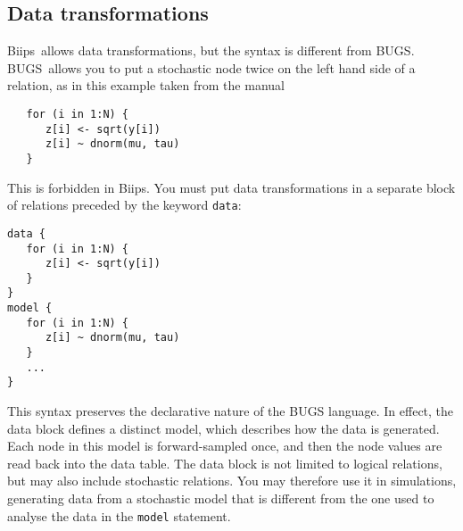 \documentclass[11pt, a4paper, titlepage]{report}
\newcommand{\biips}{\textsf{Biips}}
\newcommand{\BUGS}{\textsf{BUGS}}
\begin{document}
% 
% 

\subsection{Data transformations}
\label{section:data:tranformations}

\biips\ allows data transformations, but the syntax is different from
\BUGS.  \BUGS\ allows you to put a stochastic node twice on the left
hand side of a relation, as in this example taken from the manual
\begin{verbatim}
   for (i in 1:N) {
      z[i] <- sqrt(y[i])
      z[i] ~ dnorm(mu, tau)
   }
\end{verbatim}
This is forbidden in \biips. You must put data transformations in a 
separate block of relations preceded by the keyword \texttt{data}:
\begin{verbatim}
data {
   for (i in 1:N) {
      z[i] <- sqrt(y[i])
   }
}
model {
   for (i in 1:N) {
      z[i] ~ dnorm(mu, tau)
   }
   ...
}
\end{verbatim}
This syntax preserves the declarative nature of the BUGS language.
In effect, the data block defines a distinct model, which describes
how the data is generated. Each node in this model is forward-sampled
once, and then the node values are read back into the data table. The
data block is not limited to logical relations, but may also include
stochastic relations. You may therefore use it in simulations,
generating data from a stochastic model that is different from the one
used to analyse the data in the \texttt{model} statement.
\end{document}
